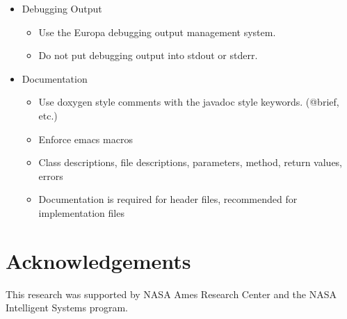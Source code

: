 \documentclass[10pt, letterpaper, twoside]{article}
\begin{document}
\begin{itemize}
\item[] Debugging Output
 \begin{itemize}
  \item	Use the Europa debugging output management system.
  \item	Do not put debugging output into stdout or stderr.
 \end{itemize}

\item[] Documentation
 \begin{itemize}
  \item	Use doxygen style comments with the javadoc style keywords. (@brief, etc.)
  \item	Enforce emacs macros
  \item	Class descriptions, file descriptions, parameters, method, return values, errors  
  \item	Documentation is required for header files, recommended for implementation files
 \end{itemize}
\end{itemize}

\section{Acknowledgements}
\label{ack}
This research was supported by NASA Ames Research Center and the NASA
Intelligent Systems program. 
\end{document}
